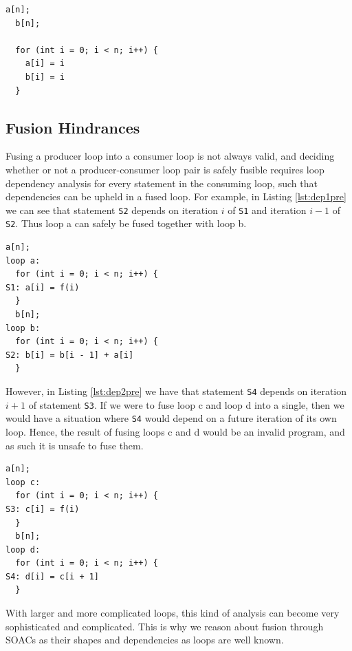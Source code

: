 \documentclass[11pt]{article}
\begin{document}
\begin{lstlisting}[caption=Post-fusion,label={lst:horipost}]
  a[n];
  b[n];
  
  for (int i = 0; i < n; i++) {
    a[i] = i
    b[i] = i  
  }
\end{lstlisting}

\subsection{Fusion Hindrances}
Fusing a producer loop into a consumer loop is not always valid, and deciding whether or not a producer-consumer loop pair is safely fusible requires loop dependency analysis for every statement 
 in the consuming loop, such that dependencies can be upheld in a fused loop.
 For example, in Listing \ref{lst:dep1pre} we can see that statement \texttt{S2} depends on iteration $i$ of \texttt{S1} and iteration $i-1$ of \texttt{S2}. Thus loop a can safely be fused together
 with loop b.

\begin{lstlisting}[caption=Example dependencies,label={lst:dep1pre}]
  a[n];
loop a:
  for (int i = 0; i < n; i++) {
S1: a[i] = f(i)
  }
  b[n];
loop b:
  for (int i = 0; i < n; i++) {
S2: b[i] = b[i - 1] + a[i]  
  }
\end{lstlisting}
However, in Listing \ref{lst:dep2pre} we have that statement \texttt{S4} depends on iteration $i+1$ of statement \texttt{S3}. If we were to fuse loop c and loop d into a single, then we would
 have a situation where \texttt{S4} would depend on a future iteration of its own loop. Hence, the result of fusing loops c and d would be an invalid program, and as such it is unsafe to fuse them.
\begin{lstlisting}[caption=Example dependencies,label={lst:dep2pre}]
  a[n];
loop c:
  for (int i = 0; i < n; i++) {
S3: c[i] = f(i)
  }
  b[n];
loop d:
  for (int i = 0; i < n; i++) {
S4: d[i] = c[i + 1]  
  }
\end{lstlisting}
With larger and more complicated loops, this kind of analysis can become very sophisticated and complicated. This is why we reason about fusion through SOACs as their shapes and dependencies as loops
 are well known.
\end{document}
